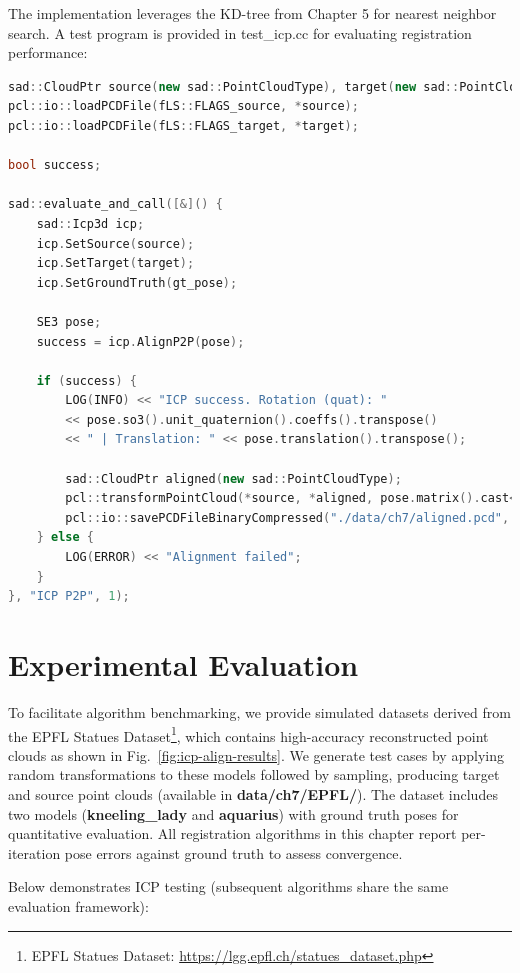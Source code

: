 The implementation leverages the KD-tree from Chapter 5 for nearest neighbor search. A test program is provided in test\_icp.cc for evaluating registration performance:

\begin{lstlisting}[language=c++,caption=src/ch7/test/test_icp.cc]
sad::CloudPtr source(new sad::PointCloudType), target(new sad::PointCloudType);
pcl::io::loadPCDFile(fLS::FLAGS_source, *source);
pcl::io::loadPCDFile(fLS::FLAGS_target, *target);

bool success;

sad::evaluate_and_call([&]() {
	sad::Icp3d icp;
	icp.SetSource(source);
	icp.SetTarget(target);
	icp.SetGroundTruth(gt_pose);
	
	SE3 pose;
	success = icp.AlignP2P(pose);
	
	if (success) {
		LOG(INFO) << "ICP success. Rotation (quat): " 
		<< pose.so3().unit_quaternion().coeffs().transpose()
		<< " | Translation: " << pose.translation().transpose();
		
		sad::CloudPtr aligned(new sad::PointCloudType);
		pcl::transformPointCloud(*source, *aligned, pose.matrix().cast<float>());
		pcl::io::savePCDFileBinaryCompressed("./data/ch7/aligned.pcd", *aligned);
	} else {
		LOG(ERROR) << "Alignment failed";
	}
}, "ICP P2P", 1);
\end{lstlisting}

\section{Experimental Evaluation}
To facilitate algorithm benchmarking, we provide simulated datasets derived from the EPFL Statues Dataset\footnote{EPFL Statues Dataset: \url{https://lgg.epfl.ch/statues_dataset.php}}, which contains high-accuracy reconstructed point clouds as shown in Fig.~\ref{fig:icp-align-results}. We generate test cases by applying random transformations to these models followed by sampling, producing target and source point clouds (available in \textbf{data/ch7/EPFL/}). The dataset includes two models (\textbf{kneeling\_lady} and \textbf{aquarius}) with ground truth poses for quantitative evaluation. All registration algorithms in this chapter report per-iteration pose errors against ground truth to assess convergence.

Below demonstrates ICP testing (subsequent algorithms share the same evaluation framework):

